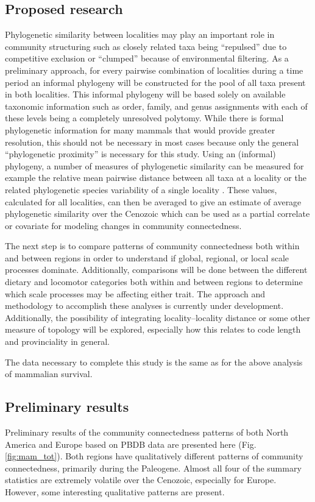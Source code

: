 \documentclass[12pt,letterpaper]{article}
\begin{document}
\subsection{Proposed research}
Phylogenetic similarity between localities may play an important role in community structuring \citep{Webb2002} such as closely related taxa being ``repulsed'' due to competitive exclusion or ``clumped'' because of environmental filtering. As a preliminary approach, for every pairwise combination of localities during a time period an informal phylogeny will be constructed for the pool of all taxa present in both localities. This informal phylogeny will be based solely on available taxonomic information such as order, family, and genus assignments with each of these levels being a completely unresolved polytomy. While there is formal phylogenetic information for many mammals that would provide greater resolution, this should not be necessary in most cases because only the general ``phylogenetic proximity'' is necessary for this study. Using an (informal) phylogeny, a number of measures of phylogenetic similarity can be measured for example the relative mean pairwise distance between all taxa at a locality \citep{Webb2002} or the related phylogenetic species variability of a single locality \citet{Helmus2007a}. These values, calculated for all localities, can then be averaged to give an estimate of average phylogenetic similarity over the Cenozoic which can be used as a partial correlate or covariate for modeling changes in community connectedness.

The next step is to compare patterns of community connectedness both within and between regions in order to understand if global, regional, or local scale processes dominate. Additionally, comparisons will be done between the different dietary and locomotor categories both within and between regions to determine which scale processes may be affecting either trait. The approach and methodology to accomplish these analyses is currently under development. Additionally, the possibility of integrating locality--locality distance or some other measure of topology will be explored, especially how this relates to code length and provinciality in general.

The data necessary to complete this study is the same as for the above analysis of mammalian survival.

\subsection{Preliminary results}
Preliminary results of the community connectedness patterns of both North America and Europe based on PBDB data are presented here (Fig. \ref{fig:mam_tot}). Both regions have qualitatively different patterns of community connectedness, primarily during the Paleogene. Almost all four of the summary statistics are extremely volatile over the Cenozoic, especially for Europe. However, some interesting qualitative patterns are present.
\end{document}
